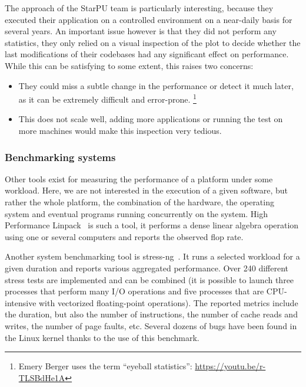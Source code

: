                 The approach of the StarPU team is particularly interesting, because they executed their application on
                a controlled environment on a near-daily basis for several years. An important issue however is that they
                did not perform any statistics, they only relied on a visual inspection of the plot to decide whether
                the last modifications of their codebases had any significant effect on performance. While this can be
                satisfying to some extent, this raises two concerns:
                \begin{itemize}
                    \item They could miss a subtle change in the performance or detect it much later, as it can be
                        extremely difficult and error-prone. \footnote{Emery Berger uses the term ``eyeball
                        statistics'': \url{https://youtu.be/r-TLSBdHe1A}}
                    \item This does not scale well, adding more applications or running the test on more machines would
                        make this inspection very tedious.
                \end{itemize}

            \subsubsection{Benchmarking systems}%

                Other tools exist for measuring the performance of a platform under some workload. Here, we are not
                interested in the execution of a given software, but rather the whole platform, \ie the combination of
                the hardware, the operating system and eventual programs running concurrently on the system.
                High Performance Linpack~\cite{hpl} is such a tool, it performs a dense linear algebra operation using
                one or several computers and reports the observed flop rate.

                Another system benchmarking tool is stress-ng~\cite{stress-ng}. It runs a selected workload for a given
                duration and reports various aggregated performance. Over 240 different stress tests are implemented and
                can be combined (\eg it is possible to launch three processes that perform many I/O operations and five
                processes that are CPU-intensive with vectorized floating-point operations). The reported metrics
                include the duration, but also the number of instructions, the number of cache reads and writes, the
                number of page faults, etc. Several dozens of bugs have been found in the Linux kernel thanks to the use
                of this benchmark.

